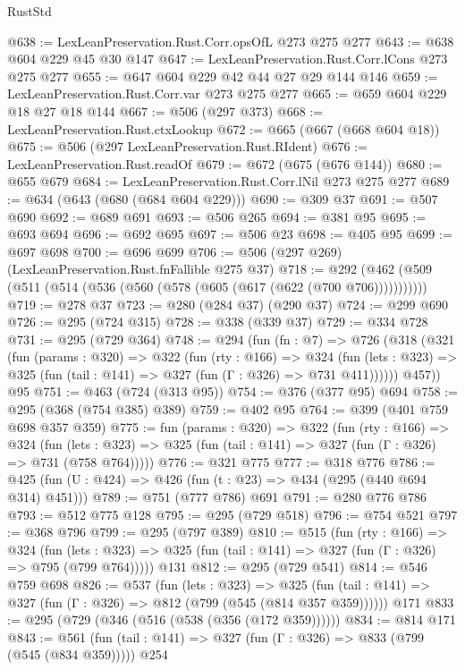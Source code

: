 \begin{lexlean}{RustStd}
\begin{coremodule}
@638 := LexLeanPreservation.Rust.Corr.opsOfL @273 @275 @277
@643 := @638 @604 @229 @45 @30 @147
@647 := LexLeanPreservation.Rust.Corr.lCons @273 @275 @277
@655 := @647 @604 @229 @42 @44 @27 @29 @144 @146
@659 := LexLeanPreservation.Rust.Corr.var @273 @275 @277
@665 := @659 @604 @229 @18 @27 @18 @144
@667 := @506 (@297 @373)
@668 := LexLeanPreservation.Rust.ctxLookup
@672 := @665 (@667 (@668 @604 @18))
@675 := @506 (@297 LexLeanPreservation.Rust.RIdent)
@676 := LexLeanPreservation.Rust.readOf
@679 := @672 (@675 (@676 @144))
@680 := @655 @679
@684 := LexLeanPreservation.Rust.Corr.lNil @273 @275 @277
@689 := @634 (@643 (@680 (@684 @604 @229)))
@690 := @309 @37
@691 := @507 @690
@692 := @689 @691
@693 := @506 @265
@694 := @381 @95
@695 := @693 @694
@696 := @692 @695
@697 := @506 @23
@698 := @405 @95
@699 := @697 @698
@700 := @696 @699
@706 := @506 (@297 @269) (LexLeanPreservation.Rust.fnFallible @275 @37)
@718 := @292 (@462 (@509 (@511 (@514 (@536 (@560 (@578 (@605 (@617 (@622 (@700 @706)))))))))))
@719 := @278 @37
@723 := @280 (@284 @37) (@290 @37)
@724 := @299 @690
@726 := @295 (@724 @315)
@728 := @338 (@339 @37)
@729 := @334 @728
@731 := @295 (@729 @364)
@748 := @294
    (fun (fn : @7) =>
    @726
      (@318
        (@321
          (fun (params : @320) =>
          @322
            (fun (rty : @166) =>
            @324
              (fun (lets : @323) =>
              @325 (fun (tail : @141) => @327 (fun (Γ : @326) => @731 @411))))))
        @457))
    @95
@751 := @463 (@724 (@313 @95))
@754 := @376 (@377 @95) @694
@758 := @295 (@368 (@754 @385) @389)
@759 := @402 @95
@764 := @399 (@401 @759 @698 @357 @359)
@775 := fun (params : @320) =>
  @322
    (fun (rty : @166) =>
    @324
      (fun (lets : @323) => @325 (fun (tail : @141) => @327 (fun (Γ : @326) => @731 (@758 @764)))))
@776 := @321 @775
@777 := @318 @776
@786 := @425 (fun (U : @424) => @426 (fun (t : @23) => @434 (@295 (@440 @694 @314) @451)))
@789 := @751 (@777 @786) @691
@791 := @280 @776 @786
@793 := @512 @775 @128
@795 := @295 (@729 @518)
@796 := @754 @521
@797 := @368 @796
@799 := @295 (@797 @389)
@810 := @515
    (fun (rty : @166) =>
    @324
      (fun (lets : @323) => @325 (fun (tail : @141) => @327 (fun (Γ : @326) => @795 (@799 @764)))))
    @131
@812 := @295 (@729 @541)
@814 := @546 @759 @698
@826 := @537
    (fun (lets : @323) =>
    @325 (fun (tail : @141) => @327 (fun (Γ : @326) => @812 (@799 (@545 (@814 @357 @359))))))
    @171
@833 := @295 (@729 (@346 (@516 (@538 (@356 (@172 @359))))))
@834 := @814 @171
@843 := @561 (fun (tail : @141) => @327 (fun (Γ : @326) => @833 (@799 (@545 (@834 @359))))) @254

\end{coremodule}
\end{lexlean}
